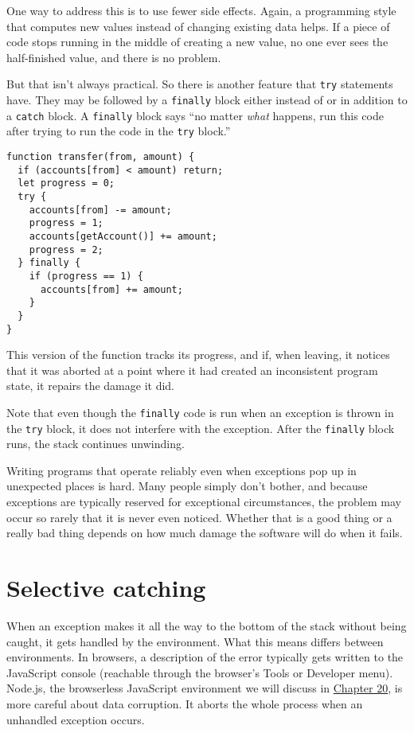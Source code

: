 One way to address this is to use fewer side effects. Again, a programming style that computes new values instead of changing existing data helps. If a piece of code stops running in the middle of creating a new value, no one ever sees the half-finished value, and there is no problem.

But that isn't always practical. So there is another feature that \lstinline`try` statements have. They may be followed by a \lstinline`finally` block either instead of or in addition to a \lstinline`catch` block. A \lstinline`finally` block says ``no matter \emph{what} happens, run this code after trying to run the code in the \lstinline`try` block.''

\begin{lstlisting}
function transfer(from, amount) {
  if (accounts[from] < amount) return;
  let progress = 0;
  try {
    accounts[from] -= amount;
    progress = 1;
    accounts[getAccount()] += amount;
    progress = 2;
  } finally {
    if (progress == 1) {
      accounts[from] += amount;
    }
  }
}
\end{lstlisting}
\noindent

This version of the function tracks its progress, and if, when leaving, it notices that it was aborted at a point where it had created an inconsistent program state, it repairs the damage it did.

Note that even though the \lstinline`finally` code is run when an exception is thrown in the \lstinline`try` block, it does not interfere with the exception. After the \lstinline`finally` block runs, the stack continues unwinding.

Writing programs that operate reliably even when exceptions pop up in unexpected places is hard. Many people simply don't bother, and because exceptions are typically reserved for exceptional circumstances, the problem may occur so rarely that it is never even noticed. Whether that is a good thing or a really bad thing depends on how much damage the software will do when it fails.

\section{Selective catching}

When an exception makes it all the way to the bottom of the stack without being caught, it gets handled by the environment. What this means differs between environments. In browsers, a description of the error typically gets written to the JavaScript console (reachable through the browser's Tools or Developer menu). Node.js, the browserless JavaScript environment we will discuss in \hyperref[node]{Chapter 20}, is more careful about data corruption. It aborts the whole process when an unhandled exception occurs.

